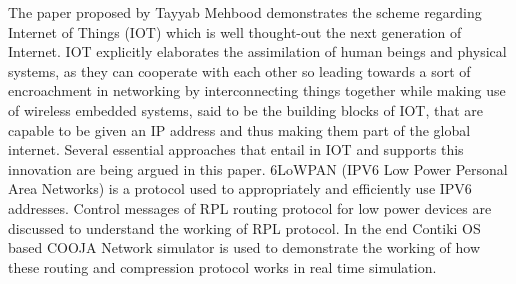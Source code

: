 The paper proposed by Tayyab Mehbood demonstrates the scheme regarding Internet of Things (IOT) which is well thought-out the next generation of Internet. IOT explicitly  elaborates  the assimilation of human beings and physical systems, as they can cooperate with each other so leading towards a sort of encroachment in networking by interconnecting things  together while making use of wireless embedded systems, said to be the building blocks of IOT, that are capable to be given an IP address and thus making them part of the  global  internet. Several  essential approaches that entail in IOT and supports this innovation are being argued in this paper. 6LoWPAN (IPV6 Low Power Personal Area Networks) is a protocol used to  appropriately  and  efficiently use IPV6 addresses. Control messages of RPL routing  protocol  for  low power devices are discussed to understand the working of RPL protocol. In the end  Contiki OS based COOJA Network simulator is used to demonstrate the working of how  these routing and compression protocol works in real time simulation\cite{5}.
